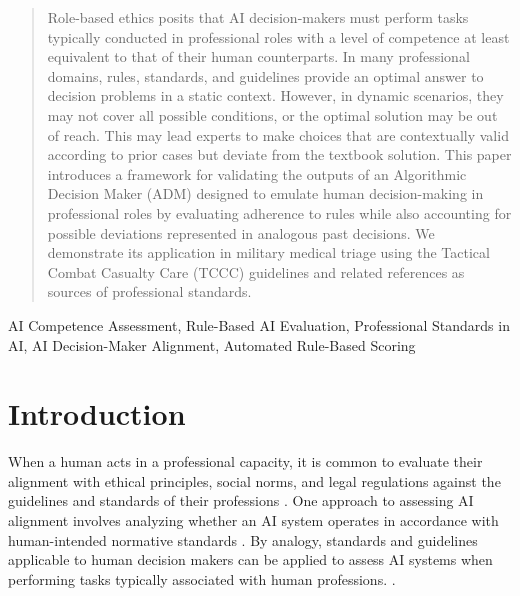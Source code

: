 \documentclass[conference]{IEEEtran}
\begin{document}
\begin{abstract}
Role-based ethics posits that AI decision-makers must perform tasks typically conducted in professional roles with a level of competence at least equivalent to that of their human counterparts. In many professional domains, rules, standards, and guidelines provide an optimal answer to decision problems in a static context. However, in dynamic scenarios, they may not cover all possible conditions, or the optimal solution may be out of reach. This may lead experts to make choices that are contextually valid according to prior cases but deviate from the textbook solution. This paper introduces a framework for validating the outputs of an Algorithmic Decision Maker (ADM) designed to emulate human decision-making in professional roles by evaluating adherence to rules while also accounting for possible deviations represented in analogous past decisions. We demonstrate its application in military medical triage using the Tactical Combat Casualty Care (TCCC) guidelines and related references as sources of professional standards.
\end{abstract}

\begin{IEEEkeywords}
AI Competence Assessment, Rule-Based AI Evaluation, Professional Standards in AI, AI Decision-Maker Alignment, Automated Rule-Based Scoring
\end{IEEEkeywords}

\section{Introduction}
\label{sec:introduction}
When a human acts in a professional capacity, it is common to evaluate their alignment with ethical principles, social norms, and legal regulations against the guidelines and standards of their professions \cite{badcott_professional_2011}.
One approach to assessing AI alignment involves analyzing whether an AI system operates in accordance with human-intended normative standards \cite{wallach_moral_2009}. By analogy, standards and guidelines applicable to human decision makers can be applied to assess AI systems when performing tasks typically associated with human professions.  \cite{awad_computational_2022}.
\end{document}
